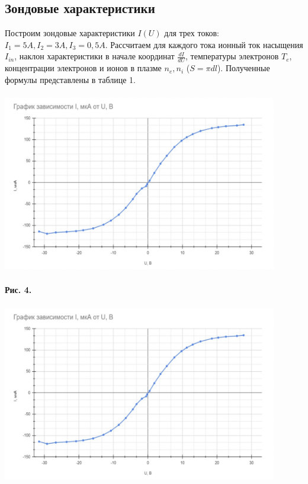 \documentclass [a4paper, 12pt]{article}
\begin{document}
\subsection{Зондовые характеристики}

    Построим зондовые характеристики $I(U)$ для трех токов: $I_1 = 5 A, I_2 = 3 A, I_3 = 0,5 A$. Рассчитаем для каждого тока ионный ток насыщения $I_{in}$, наклон характеристики в начале координат $\frac{dI}{dU}$, температуры электронов $T_e$, концентрации электронов и ионов в плазме $n_e, n_i$ ($S = \pi d l$). Полученные формулы представлены в таблице 1.


    
\begin{center}
\includegraphics[width=12cm, height=8cm]{Py2_351.jpg}
\end{center}
\begin{flushright}
{\small \textbf{Рис. 4.} }
\end{flushright}
\begin{center}
\includegraphics[width=12cm, height=8cm]{Py2_351.jpg}
\end{center}
\end{document}
